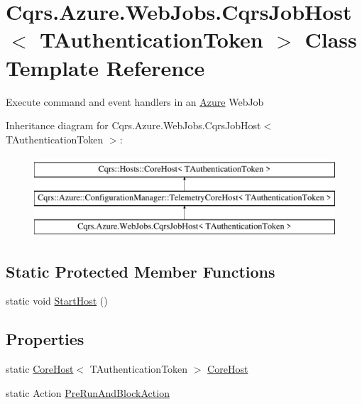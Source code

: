 \hypertarget{classCqrs_1_1Azure_1_1WebJobs_1_1CqrsJobHost}{}\section{Cqrs.\+Azure.\+Web\+Jobs.\+Cqrs\+Job\+Host$<$ T\+Authentication\+Token $>$ Class Template Reference}
\label{classCqrs_1_1Azure_1_1WebJobs_1_1CqrsJobHost}


Execute command and event handlers in an \hyperlink{namespaceCqrs_1_1Azure}{Azure} Web\+Job  


Inheritance diagram for Cqrs.\+Azure.\+Web\+Jobs.\+Cqrs\+Job\+Host$<$ T\+Authentication\+Token $>$\+:\begin{figure}[H]
\begin{center}
\leavevmode
\includegraphics[height=3.000000cm]{classCqrs_1_1Azure_1_1WebJobs_1_1CqrsJobHost}
\end{center}
\end{figure}
\subsection*{Static Protected Member Functions}
\begin{DoxyCompactItemize}
\item 
static void \hyperlink{classCqrs_1_1Azure_1_1WebJobs_1_1CqrsJobHost_a836ef65628bb4b63942beedfb17f1269_a836ef65628bb4b63942beedfb17f1269}{Start\+Host} ()
\end{DoxyCompactItemize}
\subsection*{Properties}
\begin{DoxyCompactItemize}
\item 
static \hyperlink{classCqrs_1_1Hosts_1_1CoreHost}{Core\+Host}$<$ T\+Authentication\+Token $>$ \hyperlink{classCqrs_1_1Azure_1_1WebJobs_1_1CqrsJobHost_a840ffdd7a98109cce3efd3ae3562941e_a840ffdd7a98109cce3efd3ae3562941e}{Core\+Host}
\item 
static Action \hyperlink{classCqrs_1_1Azure_1_1WebJobs_1_1CqrsJobHost_afd124af2c14bb654b6fefd6842ceebeb_afd124af2c14bb654b6fefd6842ceebeb}{Pre\+Run\+And\+Block\+Action}
\end{DoxyCompactItemize}
